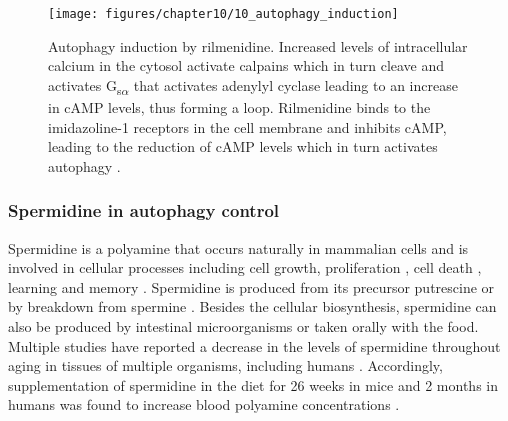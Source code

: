 \begin{figure}[!htbp]
  \texttt{[image: figures/chapter10/10\_autophagy\_induction]}
  \caption[Autophagy induction by rilmenidine]{Autophagy induction by rilmenidine. Increased levels of intracellular calcium in the cytosol activate calpains which in turn cleave and activates G\textsubscript{s}\textsubscript{$\alpha$} that activates adenylyl cyclase leading to an increase in cAMP levels, thus forming a loop. Rilmenidine binds to the imidazoline-1 receptors in the cell membrane and inhibits cAMP, leading to the reduction of cAMP levels which in turn activates autophagy \citep{Fleming2011}.}  
  \label{fig:10_autophagy_induction}
\end{figure}

\subsubsection{Spermidine in autophagy control}
Spermidine is a polyamine that occurs naturally in mammalian cells and is involved in cellular processes including cell growth, proliferation \citep{Gonzalez-Polo2015,Madeo2018,Minois2014}, cell death \citep{Igarashi2010,Pegg2016}, learning and memory \citep{Guerra2016}. Spermidine is produced from its precursor putrescine or by breakdown from spermine \citep{Madeo2018}. Besides the cellular biosynthesis, spermidine can also be produced by intestinal microorganisms or taken orally with the food. Multiple studies have reported a decrease in the levels of spermidine throughout aging in tissues of multiple organisms, including humans \citep{Eisenberg2009,Gupta2013,Pucciarelli2012,Scalabrino1984}. Accordingly, supplementation of spermidine in the diet for 26 weeks in mice and 2 months in humans was found to increase blood polyamine concentrations \citep{Soda2009,Soda2013}. 

